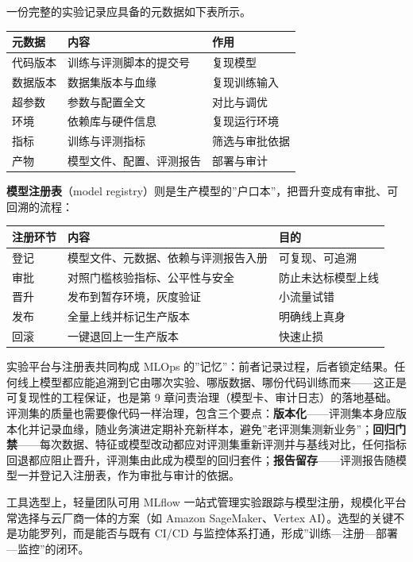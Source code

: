 \documentclass[
]{ctexbook}
\newcounter{none}
\begin{document}
一份完整的实验记录应具备的元数据如下表所示。

{\def\LTcaptype{none} %
\begin{longtable}[]{@{}lll@{}}
\toprule\noalign{}
元数据 & 内容 & 作用 \\
\midrule\noalign{}
\endhead
\bottomrule\noalign{}
\endlastfoot
代码版本 & 训练与评测脚本的提交号 & 复现模型 \\
数据版本 & 数据集版本与血缘 & 复现训练输入 \\
超参数 & 参数与配置全文 & 对比与调优 \\
环境 & 依赖库与硬件信息 & 复现运行环境 \\
指标 & 训练与评测指标 & 筛选与审批依据 \\
产物 & 模型文件、配置、评测报告 & 部署与审计 \\
\end{longtable}
}

\textbf{模型注册表}（model
registry）则是生产模型的''户口本''，把晋升变成有审批、可回溯的流程：

{\def\LTcaptype{none} %
\begin{longtable}[]{@{}lll@{}}
\toprule\noalign{}
注册环节 & 内容 & 目的 \\
\midrule\noalign{}
\endhead
\bottomrule\noalign{}
\endlastfoot
登记 & 模型文件、元数据、依赖与评测报告入册 & 可复现、可追溯 \\
审批 & 对照门槛核验指标、公平性与安全 & 防止未达标模型上线 \\
晋升 & 发布到暂存环境，灰度验证 & 小流量试错 \\
发布 & 全量上线并标记生产版本 & 明确线上真身 \\
回滚 & 一键退回上一生产版本 & 快速止损 \\
\end{longtable}
}

实验平台与注册表共同构成 MLOps
的''记忆''：前者记录过程，后者锁定结果。任何线上模型都应能追溯到它由哪次实验、哪版数据、哪份代码训练而来------这正是可复现性的工程保证，也是第
9
章问责治理（模型卡、审计日志）的落地基础。评测集的质量也需要像代码一样治理，包含三个要点：\textbf{版本化}------评测集本身应版本化并记录血缘，随业务演进定期补充新样本，避免''老评测集测新业务''；\textbf{回归门禁}------每次数据、特征或模型改动都应对评测集重新评测并与基线对比，任何指标回退都应阻止晋升，评测集由此成为模型的回归套件；\textbf{报告留存}------评测报告随模型一并登记入注册表，作为审批与审计的依据。

工具选型上，轻量团队可用 MLflow
一站式管理实验跟踪与模型注册，规模化平台常选择与云厂商一体的方案（如
Amazon SageMaker、Vertex AI）。选型的关键不是功能罗列，而是能否与既有
CI/CD 与监控体系打通，形成''训练---注册---部署---监控''的闭环。
\end{document}
